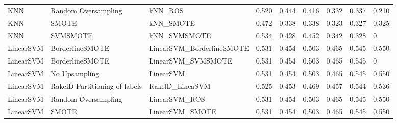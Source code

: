 \begin{tabular}{lllllllll}
                            KNN &           Random Oversampling &                                      kNN\_ROS & 0.520 &                     0.444 &                 0.416 &                  0.332 &                                   0.337 &     0.210 \\
                            KNN &                         SMOTE &                                    kNN\_SMOTE & 0.472 &                     0.338 &                 0.338 &                  0.323 &                                   0.327 &     0.325 \\
                            KNN &                      SVMSMOTE &                                 kNN\_SVMSMOTE & 0.534 &                     0.428 &                 0.452 &                  0.342 &                                   0.328 &         0 \\
                      LinearSVM &               BorderlineSMOTE &                    LinearSVM\_BorderlineSMOTE & 0.531 &                     0.454 &                 0.503 &                  0.465 &                                   0.545 &     0.550 \\
                      LinearSVM &               BorderlineSMOTE &                           LinearSVM\_SVMSMOTE & 0.531 &                     0.454 &                 0.503 &                  0.465 &                                   0.545 &         0 \\
                      LinearSVM &                 No Upsampling &                                    LinearSVM & 0.531 &                     0.454 &                 0.503 &                  0.465 &                                   0.545 &     0.550 \\
                      LinearSVM & RakelD Partitioning of labels &                              RakelD\_LineaSVM & 0.525 &                     0.453 &                 0.469 &                  0.457 &                                   0.544 &     0.536 \\
                      LinearSVM &           Random Oversampling &                                LinearSVM\_ROS & 0.531 &                     0.454 &                 0.503 &                  0.465 &                                   0.545 &     0.550 \\
                      LinearSVM &                         SMOTE &                              LinearSVM\_SMOTE & 0.531 &                     0.454 &                 0.503 &                  0.465 &                                   0.545 &     0.550 \\

\end{tabular}
